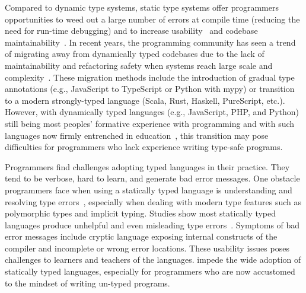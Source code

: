 Compared to dynamic type systems, static type systems offer programmers opportunities to weed out a large number of errors at compile time (reducing the need for run-time debugging) and to increase usability~\cite{mayer2012static} and codebase maintainability~\cite{kleinschmager2012static}. In recent years, the programming community has seen a trend of migrating away from dynamically typed codebases due to the lack of maintainability and refactoring safety when systems reach large scale and complexity~\cite{chatley2019next700}. These migration methods include the introduction of gradual type annotations (e.g., JavaScript to TypeScript or Python with mypy) or transition to a modern strongly-typed language (Scala, Rust, Haskell, PureScript, etc.). However, with dynamically typed languages (e.g., JavaScript, PHP, and Python) still being most peoples' formative experience with programming and with such languages now firmly entrenched in education~\cite{so2022survey}, this transition may pose difficulties for programmers who lack experience writing type-safe programs.


Programmers find challenges adopting typed languages in their practice. They tend to be verbose, hard to learn, and generate bad error messages. 
One obstacle programmers face when using a statically typed language is understanding and resolving type errors~\cite{marceau2011measuring, tirronen2015understanding}, especially when dealing with modern type features such as polymorphic types and implicit typing. Studies show most statically typed languages produce unhelpful and even misleading type errors~\cite{yang2000improved, some more proof}. Symptoms of bad error messages include cryptic language exposing internal constructs of the compiler and incomplete or wrong error locations. These usability issues poses challenges to learners and teachers of the languages. impede the wide adoption of statically typed languages, especially for programmers who are now accustomed to the mindset of writing un-typed programs.


